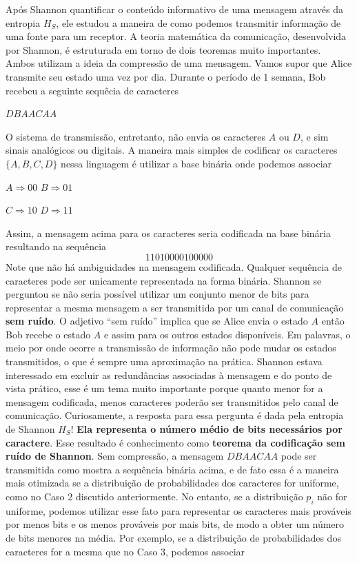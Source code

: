 \documentclass{article}
\begin{document}
Após Shannon quantificar o conteúdo informativo de uma mensagem através da entropia $H_S$, ele estudou a maneira de como podemos transmitir informação de uma fonte para um receptor. A teoria matemática da comunicação, desenvolvida por Shannon, é estruturada em torno de dois teoremas muito importantes. Ambos utilizam a ideia da compressão de uma mensagem. Vamos supor que Alice transmite seu estado uma vez por dia. Durante o período de 1 semana, Bob recebeu a seguinte sequêcia de caracteres
\begin{center}
    $DBAACAA$
\end{center}
O sistema de transmissão, entretanto, não envia os caracteres $A$ ou $D$, e sim sinais analógicos ou digitais. A maneira mais simples de codificar os caracteres $\{ A,B,C,D \}$ nessa linguagem é utilizar a base binária onde podemos associar
\begin{center}
    $A \Longrightarrow 00$ \hspace{0.5cm} $B \Longrightarrow 01$
\end{center}
\begin{center}
    $C \Longrightarrow 10$ \hspace{0.5cm} $D \Longrightarrow 11$
\end{center}
Assim, a mensagem acima para os caracteres seria codificada na base binária resultando na sequência
\begin{equation}
    11010000100000
\end{equation}
Note que não há ambiguidades na mensagem codificada. Qualquer sequência de caracteres pode ser unicamente representada na forma binária. Shannon se perguntou se não seria possível utilizar um conjunto menor de bits para representar a mesma mensagem a ser transmitida por um canal de comunicação \textbf{sem ruído}. O adjetivo ``sem ruído'' implica que se Alice envia o estado $A$ então Bob recebe o estado $A$ e assim para os outros estados disponíveis. Em palavras, o meio por onde ocorre a transmissão de informação não pode mudar os estados transmitidos, o que é sempre uma aproximação na prática. Shannon estava interessado em excluir as redundâncias associadas à mensagem e do ponto de vista prático, esse é um tema muito importante porque quanto menor for a mensagem codificada, menos caracteres poderão ser transmitidos pelo canal de comunicação. Curiosamente, a resposta para essa pergunta é dada pela entropia de Shannon $H_S$! \textbf{Ela representa o número médio de bits necessários por caractere}. Esse resultado é conhecimento como \textbf{teorema da codificação sem ruído de Shannon}. Sem compressão, a mensagem $DBAACAA$ pode ser transmitida como mostra a sequência binária acima, e de fato essa é a maneira mais otimizada se a distribuição de probabilidades dos caracteres for uniforme, como no Caso 2 discutido anteriormente. No entanto, se a distribuição $p_i$ não for uniforme, podemos utilizar esse fato para representar os caracteres mais prováveis por menos bits e os menos prováveis por mais bits, de modo a obter um número de bits menores na média. Por exemplo, se a distribuição de probabilidades dos caracteres for a mesma que no Caso 3, podemos associar
\end{document}
